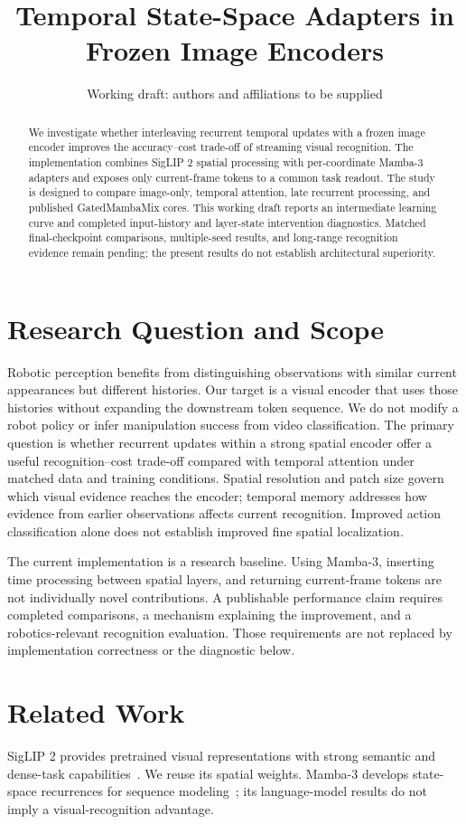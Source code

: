 \documentclass[letterpaper,10pt,conference]{ieeeconf}
\title{Temporal State-Space Adapters in Frozen Image Encoders}
\author{Working draft: authors and affiliations to be supplied}
\begin{document}
\maketitle
\begin{abstract}
We investigate whether interleaving recurrent temporal updates with a frozen
image encoder improves the accuracy--cost trade-off of streaming visual
recognition. The implementation combines SigLIP 2 spatial processing with
per-coordinate Mamba-3 adapters and exposes only current-frame tokens to a
common task readout. The study is designed to compare image-only, temporal
attention, late recurrent processing, and published GatedMambaMix cores.
This working draft reports an intermediate learning curve and completed
input-history and layer-state intervention diagnostics. Matched final-checkpoint comparisons,
multiple-seed results, and long-range recognition evidence remain pending;
the present results do not establish architectural superiority.
\end{abstract}

\section{Research Question and Scope}
Robotic perception benefits from distinguishing observations with similar
current appearances but different histories. Our target is a visual encoder
that uses those histories without expanding the downstream token sequence.
We do not modify a robot policy or infer manipulation success from video
classification. The primary question is whether recurrent updates within a
strong spatial encoder offer a useful recognition--cost trade-off compared
with temporal attention under matched data and training conditions.
Spatial resolution and patch size govern which visual evidence reaches the
encoder; temporal memory addresses how evidence from earlier observations
affects current recognition. Improved action classification alone does not
establish improved fine spatial localization.

The current implementation is a research baseline. Using Mamba-3, inserting
time processing between spatial layers, and returning current-frame tokens
are not individually novel contributions. A publishable performance claim
requires completed comparisons, a mechanism explaining the improvement,
and a robotics-relevant recognition evaluation. Those requirements are
not replaced by implementation correctness or the diagnostic below.

\section{Related Work}
SigLIP 2 provides pretrained visual representations with strong semantic
and dense-task capabilities~\cite{siglip2}. We reuse its spatial weights.
Mamba-3 develops state-space recurrences for sequence modeling~\cite{mamba3};
its language-model results do not imply a visual-recognition advantage.
\end{document}

